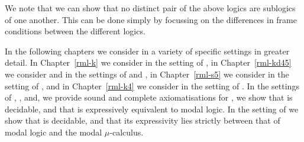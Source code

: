 We note that we can show that no distinct pair of the above logics are sublogics of one another.
This can be done simply by focussing on the differences in frame conditions between the different logics.

In the following chapters we consider \logicRml{} in a variety of specific settings in greater detail.
In Chapter~\ref{rml-k} we consider \logicRmlK{} in the setting of \classK{}, in Chapter~\ref{rml-kd45} we consider \logicRmlKFF{} and \logicRmlKD{} in the settings of \classKFF{} and \classKD{}, in Chapter~\ref{rml-s5} we consider \logicRmlS{} in the setting of \classS{}, and in Chapter~\ref{rml-k4} we consider \logicRmlKF{} in the setting of \classKF{}.
In the settings of \classK{}, \classKFF{}, \classKD{} and, \classS{} we provide sound and complete axiomatisations for \logicRml{}, we show that \logicRml{} is decidable, and that \logicRml{} is expressively equivalent to modal logic.
In the setting of \classKF{} we show that \logicRml{} is decidable, and that its expressivity lies strictly between that of modal logic and the modal $\mu$-calculus.
